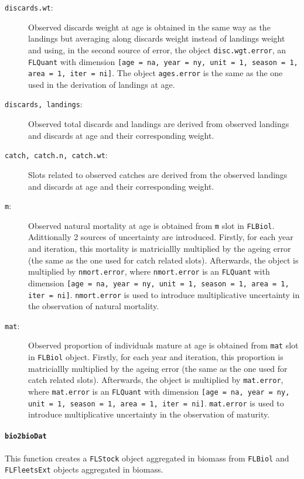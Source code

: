 \begin{description}
	\item[\texttt{discards.wt}:] Observed discards weight at age is obtained in the same way as the landings but averaging along discards weight instead of landings weight and using, in the second source of error, the object \texttt{disc.wgt.error}, an \texttt{FLQuant} with dimension \texttt{[age = na, year = ny, unit = 1, season = 1, area = 1, iter = ni]}.
	The object \texttt{ages.error} is the same as the one used in the derivation of landings at age. 
	
	\item[\texttt{discards, landings}:] Observed total discards and landings are derived from observed landings and discards at age and their corresponding weight.
	
	\item[\texttt{catch, catch.n, catch.wt}:] Slots related to observed catches are derived from the observed landings and discards at age and their corresponding weight.
		
	\item[\texttt{m}:] Observed natural mortality at age is obtained from \texttt{m} slot in \texttt{FLBiol}. Adittionally 2 sources of uncertainty are introduced.
	Firstly, for each year and iteration, this mortality is matriciallly multiplied by the ageing error (the same as the one used for catch related slots).
	Afterwards, the object is multiplied by \texttt{nmort.error}, where \texttt{nmort.error} is an \texttt{FLQuant} with dimension \texttt{[age = na, year = ny, unit = 1, season = 1, area = 1, iter = ni]}. 
	\texttt{nmort.error} is used to introduce multiplicative uncertainty in the observation of natural mortality. 
	
	\item[\texttt{mat}:] Observed proportion of individuals mature at age is obtained from \texttt{mat} slot in \texttt{FLBiol} object.
	Firstly, for each year and iteration, this proportion is matriciallly multiplied by the ageing error (the same as the one used for catch related slots).
	Afterwards, the object is multiplied by \texttt{mat.error}, where \texttt{mat.error} is an \texttt{FLQuant} with dimension \texttt{[age = na, year = ny, unit = 1, season = 1, area = 1, iter = ni]}.
	\texttt{mat.error} is used to introduce multiplicative uncertainty in the observation of maturity.

\end{description}


\paragraph{\texttt{bio2bioDat}} \hspace{0pt} \smallskip
	 This function creates a \texttt{FLStock} object aggregated in biomass from \texttt{FLBiol} and \texttt{FLFleetsExt} objects aggregated in biomass. 
		

